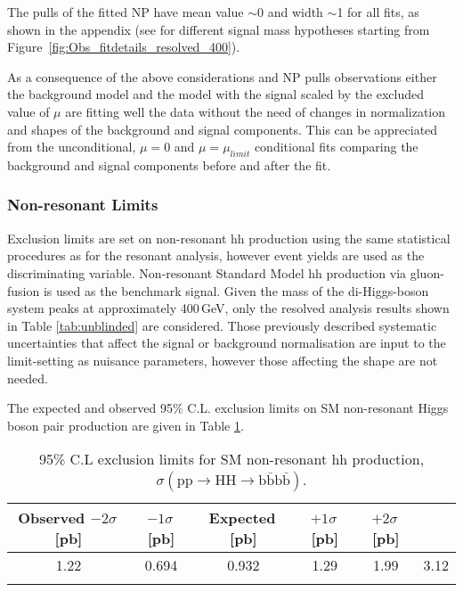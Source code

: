 The pulls of the fitted NP have mean value $\sim$0 and width $\sim$1 for all fits, as shown
in the appendix (see for different signal mass hypotheses starting from Figure~\ref{fig:Obs_fitdetails_resolved_400}).

As a consequence of the above considerations and NP pulls observations either the background model
and the model with the signal scaled by the excluded value of $\mu$ are fitting well the data
without the need of changes in normalization and shapes of the background and signal components.
This can be appreciated from the unconditional, $\mu=0$ and $\mu=\mu_{limit}$ conditional fits
comparing the background and signal components before and after the fit.



\subsubsection{Non-resonant Limits}
Exclusion limits are set on non-resonant hh production using the same statistical procedures as for the resonant analysis, however event yields are used as the discriminating variable. Non-resonant Standard Model hh production via gluon-fusion is used as the benchmark signal. Given the mass of the di-Higgs-boson system peaks at approximately 400\,GeV, only the resolved analysis results shown in Table \ref{tab:unblinded} are considered. Those previously described systematic uncertainties that affect the signal or background normalisation are input to the limit-setting as nuisance parameters, however those affecting the \mfourj shape are not needed.

The expected and observed 95\% C.L. exclusion limits on SM non-resonant Higgs boson pair production are given in Table \ref{tab:smhhlims}.

\begin{table}[htp]
\caption{95\% C.L exclusion limits for SM non-resonant hh production, $\sigma(\mathrm{pp\rightarrow HH\rightarrow b\bar{b}b\bar{b}})$.}
\begin{center}\begin{tabular}{cccccc}\toprule
Observed $-2\sigma$\,[pb] & $-1\sigma$\,[pb] & Expected\,[pb] & $+1\sigma$\,[pb] & $+2\sigma$\,[pb]\\
\midrule
1.22 & 0.694 & 0.932 & 1.29 & 1.99 & 3.12 \\
\bottomrule
\label{tab:smhhlims}\end{tabular}\end{center}\end{table}
